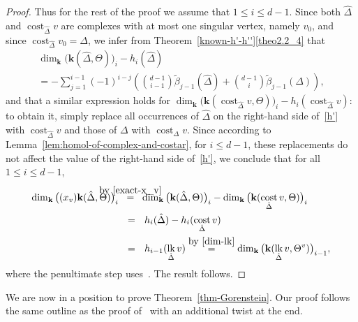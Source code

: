 \documentclass[10pt]{amsart}
\theoremstyle{definition}
\DeclareMathOperator\lk{lk}
\DeclareMathOperator\cost{cost}
\newcommand{\complet}[1]{\hat{#1}}
\newcommand{\field}{\mathbf{k}}
\begin{document}
\begin{proof}
Thus for the rest of the proof we assume that $1\leq i\leq d-1$. Since both $\complet{\Delta}$ and $\cost_{\complet{\Delta}}v$ are complexes with at most one singular vertex, namely $v_0$, and since $\cost_{\complet{\Delta}}v_0=\Delta$, we infer from Theorem~\ref{known-h'-h''}\eqref{theo2.2_4} that
\begin{multline} \label{h'}
\dim_\field \big(\field(\complet{\Delta},\Theta)\big)_i-h_i(\complet{\Delta}) \\
=
-\sum_{j=1}^{i-1}(-1)^{i-j}\left(\binom{d-1}{i-1}\tilde{\beta}_{j-1}(\complet{\Delta})+\binom{d-1}{i}\tilde{\beta}_{j-1}(\Delta)\right),
\end{multline}
and that a similar expression holds for $\dim_\field\big(\field(\cost_{\complet{\Delta}}v,\Theta)\big)_i-h_i(\cost_{\complet{\Delta}}v)$: to obtain it, simply replace all occurrences of $\complet{\Delta}$ on the right-hand side of~\eqref{h'} with $\cost_{\complet{\Delta}}v$ and those of $\Delta$ with $\cost_{\Delta}v$. Since according to Lemma~\ref{lem:homol-of-complex-and-costar}, for $i\leq d-1$, these replacements do not affect the value of the right-hand side of~\eqref{h'}, we conclude that for all $1\leq i\leq d-1$,
\begin{align*}
\dim_\field \big((x_v)\field(\complet{\Delta},\Theta)\big)_i & 
\ \ \mathop{=}^{\hbox to 0pt {\hss\text{\scriptsize by~\eqref{exact-x_v}}\hss}} \ \ 
\dim_\field\big(\field(\complet{\Delta},\Theta)\big)_i- \dim_\field\big(\field(\cost_{\complet{\Delta}}v,\Theta)\big)_i 
\\
&\ \ = \ \ h_i(\complet{\Delta})-h_i(\cost_{\complet{\Delta}}v) \\
&\ \ = \ \ h_{i-1}(\lk_{\complet{\Delta}}v) \stackrel{\mbox{\tiny{by~\eqref{dim-lk}}}}{=}
\dim_\field \big(\field(\lk_{\complet{\Delta}}v, \Theta^v)\big)_{i-1}, 
\end{align*}
where the penultimate step uses~\cite[Lemma~4.1]{Athanasiadis-11}. The result follows.
\end{proof}

We are now in a position to prove Theorem~\ref{thm-Gorenstein}. Our proof follows the same outline as the proof of~\cite[Theorem~1.4]{Novik-Swartz-09:Gorenstein} with an additional twist at the end.
\end{document}
